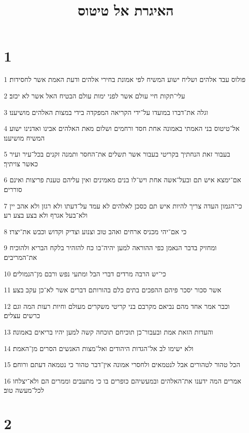 

\title{האיגרת אל טיטוס}


\chapter{1}

\par 1 פולוס עבד אלהים ושליח ישוע המשיח לפי אמונת בחירי אלהים ודעת האמת אשר לחסידות׃
\par 2 עלי־תקות חיי עולם אשר לפני ימות עולם הבטיח האל אשר לא יכזב׃
\par 3 וגלה את־דברו במועדו על־ידי הקריאה המפקדה בידי במצות האלהים מושיענו׃
\par 4 אל־טיטוס בני האמתי באמונה אחת חסד ורחמים ושלום מאת האלהים אבינו ואדנינו ישוע המשיח מושיענו׃
\par 5 בעבור זאת הנחתיך בקריטי בעבור אשר תשלים את־החסר ותמנה זקנים בכל־עיר ועיר כאשר צויתיך׃
\par 6 אם־ימצא איש תם ובעל־אשה אחת ויש־לו בנים מאמינים ואין עליהם טענת פריצות ואינם סוררים׃
\par 7 כי־הגמון העדה צריך להיות איש תם כסכן לאלהים לא עמד על־דעתו ולא רגזן ולא אהב יין ולא־בעל אגרף ולא בצע בצע רע׃
\par 8 כי אם־יהי מכניס ארחים ואהב טוב וצנוע וצדיק וקדוש וכבש את־יצרו׃
\par 9 ומחזיק בדבר הנאמן כפי ההוראה למען יהיה־בו כח להזהיר בלקח הבריא ולהוכיח את־המריבים׃
\par 10 כי־יש הרבה מרדים דברי הבל ומתעי נפש ורבם מן־הנמולים׃
\par 11 אשר סכור יסכר פיהם ההפכים בתים כלם בהורותם דברים אשר לא־כן עקב בצע׃
\par 12 וכבר אמר אחד מהם נביאם מקרבם בני קריטי משקרים מעולם וחיות רעות המה וגם כרשים עצלים׃
\par 13 והעדות הזאת אמת ובעבור־כן תוכיחם תוכחה קשה למען יהיו בריאים באמונה׃
\par 14 ולא ישימו לב אל־הגדות היהודים ואל־מצות האנשים הסרים מן־האמת׃
\par 15 הכל טהור לטהורים אבל לנטמאים ולחסרי אמונה אין־דבר טהור כי נטמאה דעתם ורוחם׃
\par 16 אמרים המה ידענו את־האלהים ובמעשיהם כופרים בו כי מתעבים וממרים הם ולא־יצלחו לכל־מעשה טוב׃

\chapter{2}

